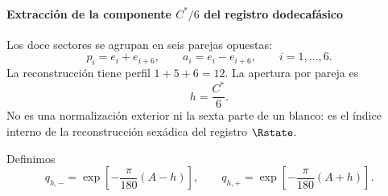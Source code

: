 \paragraph{Extracción de la componente \(C^*/6\) del registro dodecafásico}

Los doce sectores se agrupan en seis parejas opuestas:
\begin{equation}
p_i=e_i+e_{i+6},\qquad
a_i=e_i-e_{i+6},\qquad i=1,\ldots,6.
\label{eq:sexadic-pairs}
\end{equation}
La reconstrucción tiene perfil \(1+5+6=12\). La apertura por pareja es
\begin{equation}
h=\frac{C^*}{6}.
\label{eq:h-C6}
\end{equation}
No es una normalización exterior ni la sexta parte de un blanco: es el índice
interno de la reconstrucción sexádica del registro \(\Rstate\).

Definimos
\begin{equation}
q_{h,-}=\exp\left[-\frac\pi{180}(A-h)\right],
\qquad
q_{h,+}=\exp\left[-\frac\pi{180}(A+h)\right].
\label{eq:q-h}
\end{equation}

